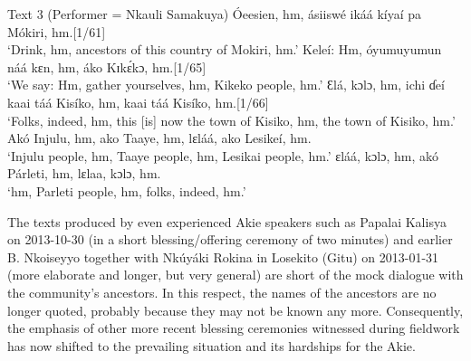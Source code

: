 \documentclass[output=paper,colorlinks,citecolor=brown]{langscibook}
\begin{document}


\ea Text 3 (Performer = Nkauli Samakuya)
    \ea    Óeesien, hm, ásiiswé ikáá kíyaí pa Mókiri, hm.\hfill [1/61]\\
            `Drink, hm, ancestors of this country of Mokiri, hm.'
    \ex    Keleí: Hm, óyumuyumun náá kɛn, hm, áko Kɪkɛ́kɔ, hm.\hfill [1/65]\\
            `We say: Hm, gather yourselves, hm, Kikeko people, hm.'
    \ex    Ɛlá, kɔlɔ, hm, ichi ɗeí kaai táá Kisíko, hm, kaai táá Kisíko, hm.\hfill [1/66]\\
            `Folks, indeed, hm, this [is] now the town of Kisiko, hm, the town of Kisiko, hm.'
    \ex    Akó Injulu, hm, ako Taaye, hm, lɛláá, ako Lesikeí, hm.\\
            `Injulu people, hm, Taaye people, hm, Lesikai people, hm.'
    \ex    ɛláá, kɔlɔ, hm, akó Párleti, hm, lɛlaa, kɔlɔ, hm.\\
           `hm, Parleti people, hm, folks, indeed, hm.'
    \z
\z

The texts produced by even experienced Akie speakers such as Papalai Kalisya on 2013-10-30 (in a short blessing/offering ceremony of two minutes) and earlier B. Nkoiseyyo together with Nkúyáki Rokina in Losekito (Gitu) on 2013-01-31 (more elaborate and longer, but very general) are short of the mock dialogue with the community’s ancestors. In this respect, the names of the ancestors are no longer quoted, probably because they may not be known any more. Consequently, the emphasis of other more recent blessing ceremonies witnessed during fieldwork has now shifted to the prevailing situation and its hardships for the Akie.
\end{document}
